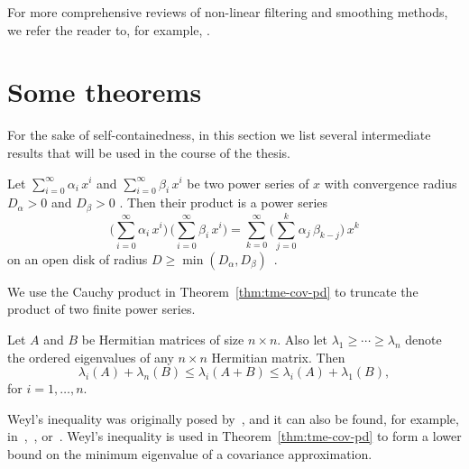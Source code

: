 For more comprehensive reviews of non-linear filtering and smoothing methods, we refer the reader to, for example, \citet{Jazwinski1970, Maybeck1982, Sarkka2013, Bain2009, Law2015, Evensen2009, Doucet2001, Sarkka2019}.

\section{Some theorems}
\label{sec:useful-theorem}
For the sake of self-containedness, in this section we list several intermediate results that will be used in the course of the thesis.

\begin{theorem}
	\label{thm:cauchy-product}
	Let $\sum^\infty_{i=0} \alpha_i \, x^i$ and $\sum^\infty_{i=0} \beta_i \, x^i$ be two power series of $x$ with convergence radius $D_{\alpha} > 0$ and $D_{\beta} > 0$ . Then their product is a power series
	\begin{equation}
		\Big(\sum^\infty_{i=0} \alpha_i \,x^i \Big)\, \Big(\sum^\infty_{i=0} \beta_i \,x^i \Big) = \sum^\infty_{k=0} \Big(\sum^k_{j=0} \alpha_j\, \beta_{k-j}\Big)\, x^k
	\end{equation}
	on an open disk of radius $D \geq \min(D_{\alpha}, D_{\beta})$~\citep[see, e.g.,][Theorem 2.37]{Canuto2015}.
\end{theorem}
We use the Cauchy product in Theorem~\ref{thm:tme-cov-pd} to truncate the product of two finite power series. 

\begin{theorem}
	\label{thm:weyl-inequality}
	Let $A$ and $B$ be Hermitian matrices of size $n\times n$. Also let $\lambda_{1} \geq \cdots \geq \lambda_{n}$ denote the ordered eigenvalues of any $n\times n$ Hermitian matrix. Then
	\begin{equation}
		\lambda_i(A) + \lambda_{n}(B) \leq \lambda_i(A+B) \leq \lambda_i(A) + \lambda_{1}(B),
	\end{equation}
	for $i=1,\ldots, n$.
\end{theorem}
Weyl's inequality was originally posed by~\citet{Weyl1912}, and it can also be found, for example, in~\citet[][Theorem 8.4.11]{Bernstein2009},~\citet{HornBook1991}, or~\citet[][Section 5]{Helmke1995}. Weyl's inequality is used in Theorem~\ref{thm:tme-cov-pd} to form a lower bound on the minimum eigenvalue of a covariance approximation.

